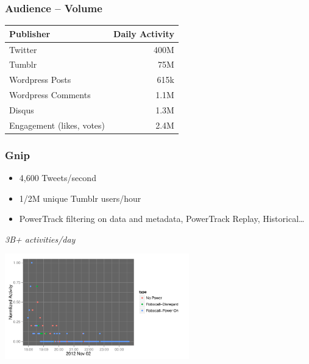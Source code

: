 \documentclass{beamer}
\begin{document}
\begin{frame} \frametitle{Audience -- Volume}
\begin{table}
\begin{tabular}{l|r}
\hline
   {Publisher}   &   {Daily Activity}   \\ [1pt]
\hline 
    Twitter      &      400M   \\
    Tumblr      &        75M   \\
    Wordpress Posts &     615k   \\
    Wordpress Comments & 1.1M \\
    Disqus       &       1.3M  \\
    Engagement (likes, votes) & 2.4M  \\
\hline
\end{tabular}
\end{table}
\end{frame}

\begin{frame}\frametitle{Gnip}
\Large{
\begin{itemize}
\item 4,600 Tweets/second \\ [2pt]
\item 1/2M unique Tumblr users/hour \\  [2pt]
\item PowerTrack filtering on data and metadata, PowerTrack Replay, Historical\ldots \\  [15pt]
\end{itemize}
}
\begin{center}
\Huge{\emph{3B+ activities/day}}
\end{center}
\end{frame}


\begin{frame}
\begin{center}
\end{center}
\end{frame}


\begin{frame}
  \begin{center}
    \includegraphics[width=8cm]{./imgs/fake.pdf}
  \end{center}
\end{frame}
\end{document}
